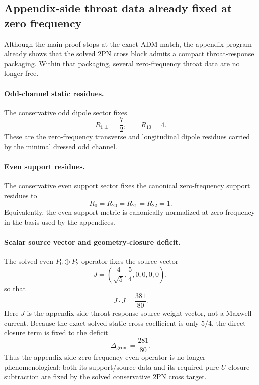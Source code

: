 \documentclass[11pt]{article}
\newcommand{\TwoPN}{\mathrm{2PN}}
\newcommand{\ADM}{\mathrm{ADM}}
\newcommand{\geom}{\mathrm{geom}}
\begin{document}
\subsection{Appendix-side throat data already fixed at zero frequency}
\label{sec:status-throat-fixed}

Although the main proof stops at the exact \(\ADM\) match, the appendix program already
shows that the solved \(\TwoPN\) cross block admits a compact throat-response packaging.
Within that packaging, several zero-frequency throat data are no longer free.

\paragraph{Odd-channel static residues.}
The conservative odd dipole sector fixes
\begin{equation}
R_{1\perp}=\frac72,
\qquad
R_{10}=4.
\label{eq:status-fixed-odd-residues}
\end{equation}
These are the zero-frequency transverse and longitudinal dipole residues carried by the
minimal dressed odd channel.

\paragraph{Even support residues.}
The conservative even support sector fixes the canonical zero-frequency support residues
to
\begin{equation}
R_0=R_{20}=R_{21}=R_{22}=1.
\label{eq:status-fixed-even-residues}
\end{equation}
Equivalently, the even support metric is canonically normalized at zero frequency in the
basis used by the appendices.

\paragraph{Scalar source vector and geometry-closure deficit.}
The solved even \(P_0\oplus P_2\) operator fixes the source vector
\begin{equation}
J=\left(\frac{4}{\sqrt5},\frac54,0,0,0,0\right),
\label{eq:status-fixed-J}
\end{equation}
so that
\begin{equation}
J\cdot J=\frac{381}{80}.
\label{eq:status-fixed-JdotJ}
\end{equation}
Here \(J\) is the appendix-side throat-response source-weight vector, not a
Maxwell current.
Because the exact solved static cross coefficient is only \(5/4\), the direct closure
term is fixed to the deficit
\begin{equation}
\Delta_{\geom}=\frac{281}{80}.
\label{eq:status-fixed-deltageom}
\end{equation}
Thus the appendix-side zero-frequency even operator is no longer phenomenological: both
its support/source data and its required pure-\(U\) closure subtraction are fixed by the
solved conservative \(\TwoPN\) cross target.
\end{document}
